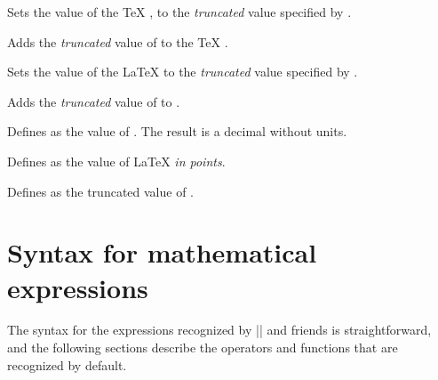 \begin{command}{\pgfmathsetcount{}}
  Sets the value of the \TeX{} , to the
  \emph{truncated} value specified by .
\end{command}

\begin{command}{\pgfmathaddtocount{}}
  Adds the \emph{truncated} value  of  to the \TeX{}
  .
\end{command}

\begin{command}{\pgfmathsetcounter{}}
  Sets the value of the \LaTeX{}  to the \emph{truncated}
  value specified by .
\end{command}

\begin{command}{\pgfmathaddtocounter{}}
  Adds the \emph{truncated} value  of  to
  .
\end{command}

\begin{command}{\pgfmathsetmacro{}}
  Defines  as the  value of . The result
  is a decimal without units.
\end{command}

\begin{command}{\pgfmathsetlengthmacro{}}
  Defines  as the value of 
  \LaTeX{} \emph{in points}.
\end{command}

\begin{command}{\pgfmathtruncatemacro{}}
  Defines  as the truncated value of .
\end{command}



\section{Syntax for mathematical expressions}

\label{pgfmath-syntax}

  The syntax for the expressions recognized by |\pgfmathparse| and
  friends is straightforward, and the following sections describe the
  operators and functions that are recognized by default.

